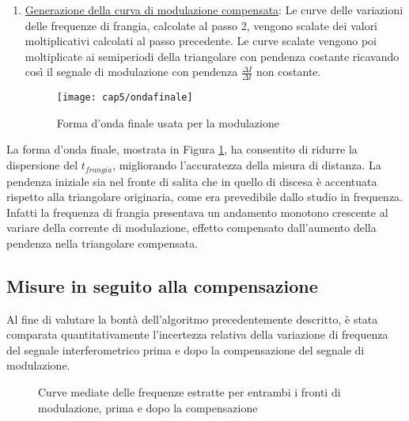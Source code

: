 \begin{enumerate}
	\item \underline{Generazione della curva di modulazione compensata}: Le curve delle variazioni delle frequenze di frangia, calcolate al passo 2, vengono scalate dei valori moltiplicativi calcolati al passo precedente. Le curve scalate vengono poi moltiplicate ai semiperiodi della triangolare con pendenza costante ricavando così il segnale di modulazione con pendenza $\frac{\Delta I}{\Delta t}$ non costante.
    \begin{figure}[H]
    	\begin{center}
    		\texttt{[image: cap5/ondafinale]}
    		\caption{Forma d'onda finale usata per la modulazione}
    		\label{ondafinale}
    	\end{center}
    \end{figure}
		
\end{enumerate}

La forma d'onda finale, mostrata in Figura \ref{ondafinale}, ha consentito di ridurre la dispersione del $t_{frangia}$, migliorando l'accuratezza della misura di distanza. La pendenza iniziale sia nel fronte di salita che in quello di discesa è accentuata rispetto alla triangolare originaria, come era prevedibile dallo studio in frequenza. Infatti la frequenza di frangia presentava un andamento monotono crescente al variare della corrente di modulazione, effetto compensato dall'aumento della pendenza nella triangolare compensata.

\subsection{Misure in seguito alla compensazione}
Al fine di valutare la bontà dell'algoritmo precedentemente descritto, è stata comparata quantitativamente l'incertezza relativa della variazione di frequenza del segnale interferometrico prima e dopo la compensazione del segnale di modulazione.

\begin{figure}[H]
\centering
{}
\end{figure}
\begin{figure}[H]
\centering
{}
\caption{Curve mediate delle frequenze estratte per entrambi i fronti di modulazione, prima e dopo la compensazione}\label{primadopocomp}
\end{figure}


